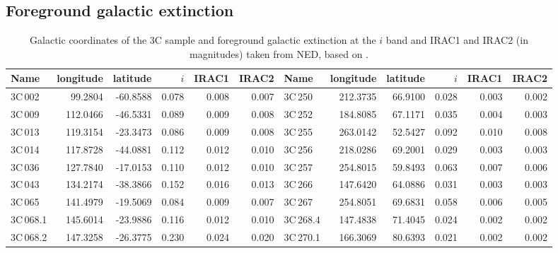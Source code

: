 \documentclass[mathleft,fleqn,%
]{an}
\begin{document}
\subsection{Foreground galactic
  extinction}
\label{sec:fge}



\begin{table*}
\renewcommand{\thetable}{\arabic{table}}
\centering
\caption{Galactic coordinates of the 3C sample and foreground galactic
  extinction at the $i$ band and  IRAC1 and IRAC2 
  (in magnitudes) taken from NED, based on \citet{Schlafly11}.
} 
\label{table_fge}
\begin{tabular}{lrrrrr|lrrrrr}
\hline
\hline
Name         &  longitude &   latitude & $i$      & IRAC1  & IRAC2  &  Name         &  longitude &   latitude &  $i$     & IRAC1  & IRAC2   \\ 
\hline                                                                         
3C\,002      &    99.2804 &   -60.8588 & 0.078    & 0.008  & 0.007  &  3C\,250      &   212.3735 &    66.9100 &  0.028   & 0.003  & 0.002   \\
3C\,009      &   112.0466 &   -46.5331 & 0.089    & 0.009  & 0.008  &  3C\,252      &   184.8085 &    67.1171 &  0.035   & 0.004  & 0.003   \\
3C\,013      &   119.3154 &   -23.3473 & 0.086    & 0.009  & 0.008  &  3C\,255      &   263.0142 &    52.5427 &  0.092   & 0.010  & 0.008   \\
3C\,014      &   117.8728 &   -44.0881 & 0.112    & 0.012  & 0.010  &  3C\,256      &   218.0286 &    69.2001 &  0.029   & 0.003  & 0.003   \\
3C\,036      &   127.7840 &   -17.0153 & 0.110    & 0.012  & 0.010  &  3C\,257      &   254.8015 &    59.8493 &  0.063   & 0.007  & 0.006   \\
3C\,043      &   134.2174 &   -38.3866 & 0.152    & 0.016  & 0.013  &  3C\,266      &   147.6420 &    64.0886 &  0.031   & 0.003  & 0.003   \\
3C\,065      &   141.4979 &   -19.5069 & 0.084    & 0.009  & 0.007  &  3C\,267      &   254.8051 &    69.6831 &  0.058   & 0.006  & 0.005   \\
3C\,068.1    &   145.6014 &   -23.9886 & 0.116    & 0.012  & 0.010  &  3C\,268.4    &   147.4838 &    71.4045 &  0.024   & 0.002  & 0.002   \\
3C\,068.2    &   147.3258 &   -26.3775 & 0.230    & 0.024  & 0.020  &  3C\,270.1    &   166.3069 &    80.6393 &  0.021   & 0.002  & 0.002   \\

\end{tabular}
\end{table*}
\end{document}
